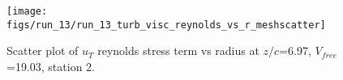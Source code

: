 \begin{figure}[H]
\centering
\texttt{[image: figs/run\_13/run\_13\_turb\_visc\_reynolds\_vs\_r\_meshscatter]}
\caption{Scatter plot of $
u_T$ reynolds stress term vs radius at $z/c$=6.97, $V_{free}$=19.03, station 2.}
\label{fig:run_13_turb_visc_reynolds_vs_r_meshscatter}
\end{figure}


